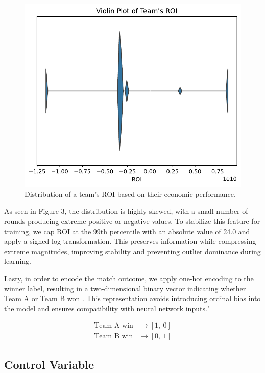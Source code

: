 \documentclass[sigconf]{acmart}
\begin{document}
\begin{figure}[ht]
  \centering
  \includegraphics[width=0.9\linewidth]{roi_violin.pdf}
  \caption{Distribution of a team's ROI based on their economic performance.}
  \label{fig:round_duration_dist}
\end{figure}

\smallskip

As seen in Figure 3, the distribution is highly skewed, with a small number of rounds producing extreme positive or negative values. To stabilize this feature for training, we cap ROI at the 99th percentile with an absolute value of 24.0 and apply a signed log transformation. This preserves information while compressing extreme magnitudes, improving stability and preventing outlier dominance during learning.

Lasty, in order to encode the match outcome, we apply one-hot encoding to the winner label, resulting in a two-dimensional binary vector indicating whether Team A or Team B won \cite{datacamp_onehot_2023}. This representation avoids introducing ordinal bias into the model and ensures compatibility with neural network inputs."

\begin{align*}
\text{Team A win} &\rightarrow [1,\ 0] \\
\text{Team B win} &\rightarrow [0,\ 1]
\end{align*}


\subsection{Control Variable}
\end{document}
